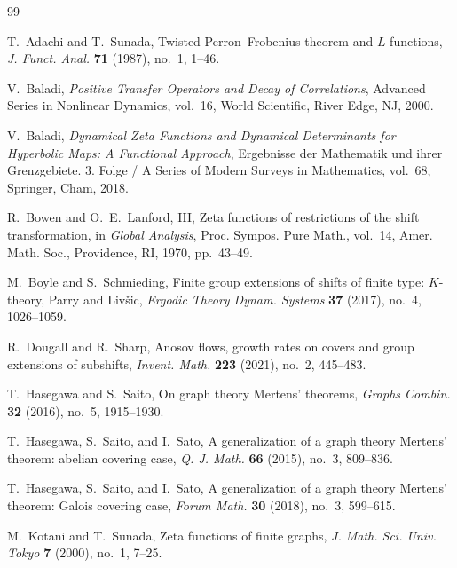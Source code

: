 \documentclass[11pt,a4paper]{amsart}
\theoremstyle{plain}
\theoremstyle{definition}
\theoremstyle{remark}
\begin{document}
\begin{thebibliography}{99}

T.~Adachi and T.~Sunada,
Twisted {P}erron--{F}robenius theorem and {$L$}-functions,
\textit{J. Funct. Anal.} \textbf{71} (1987), no.~1, 1--46.

V.~Baladi,
\textit{Positive Transfer Operators and Decay of Correlations},
Advanced Series in Nonlinear Dynamics, vol.~16,
World Scientific, River Edge, NJ, 2000.

V.~Baladi,
\textit{Dynamical Zeta Functions and Dynamical Determinants for Hyperbolic Maps:
A Functional Approach},
Ergebnisse der Mathematik und ihrer Grenzgebiete. 3. Folge / A Series of Modern Surveys in Mathematics, vol.~68,
Springer, Cham, 2018.

R.~Bowen and O.~E.~Lanford, III,
Zeta functions of restrictions of the shift transformation,
in \textit{Global Analysis},
Proc. Sympos. Pure Math., vol.~14,
Amer. Math. Soc., Providence, RI, 1970, pp.~43--49.

M.~Boyle and S.~Schmieding,
Finite group extensions of shifts of finite type: {$K$}-theory, {P}arry and {L}iv\v{s}ic,
\textit{Ergodic Theory Dynam. Systems} \textbf{37} (2017), no.~4, 1026--1059.

R.~Dougall and R.~Sharp,
Anosov flows, growth rates on covers and group extensions of subshifts,
\textit{Invent. Math.} \textbf{223} (2021), no.~2, 445--483.

T.~Hasegawa and S.~Saito,
On graph theory {M}ertens' theorems,
\textit{Graphs Combin.} \textbf{32} (2016), no.~5, 1915--1930.

T.~Hasegawa, S.~Saito, and I.~Sato,
A generalization of a graph theory {M}ertens' theorem: abelian covering case,
\textit{Q. J. Math.} \textbf{66} (2015), no.~3, 809--836.

T.~Hasegawa, S.~Saito, and I.~Sato,
A generalization of a graph theory {M}ertens' theorem: {G}alois covering case,
\textit{Forum Math.} \textbf{30} (2018), no.~3, 599--615.

M.~Kotani and T.~Sunada,
Zeta functions of finite graphs,
\textit{J. Math. Sci. Univ. Tokyo} \textbf{7} (2000), no.~1, 7--25.


\end{thebibliography}
\end{document}
